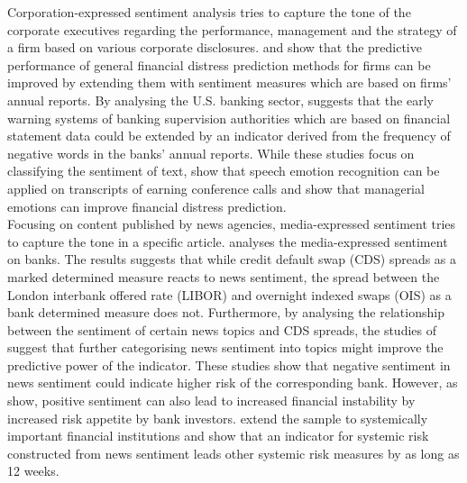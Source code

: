Corporation-expressed sentiment analysis tries to capture the tone of the corporate executives regarding the performance, management and the strategy of a firm based on various corporate disclosures. \cite{hajek2023} and \cite{huang2023} show that the predictive performance of general financial distress prediction methods for firms can be improved by extending them with sentiment measures which are based on firms' annual reports. By analysing the U.S. banking sector, \cite{gandhi2019} suggests that the early warning systems of banking supervision authorities which are based on financial statement data could be extended by an indicator derived from the frequency of negative words in the banks' annual reports. While these studies focus on classifying the sentiment of text, \cite{hajek2023} show that speech emotion recognition can be applied on transcripts of earning conference calls and show that managerial emotions can improve financial distress prediction. \\

 Focusing on content published by news agencies, media-expressed sentiment tries to capture the tone in a specific article. \cite{smales2016} analyses the media-expressed sentiment on banks. The results suggests that while credit default swap (CDS) spreads as a marked determined measure reacts to news sentiment, the spread between the London interbank offered rate (LIBOR) and overnight indexed swaps (OIS) as a bank determined measure does not. Furthermore, by analysing the relationship between the sentiment of certain news topics and CDS spreads, the studies of \cite{roeder2020} suggest that further categorising news sentiment into topics might improve the predictive power of the indicator. These studies show that negative sentiment in news sentiment could indicate higher risk of the corresponding bank. However, as \cite{agoraki2022} show, positive sentiment can also lead to increased financial instability by increased risk appetite by bank investors. \cite{borovkova2017} extend the sample to systemically important financial institutions and show that an indicator for systemic risk constructed from news sentiment leads other systemic risk measures by as long as 12 weeks. \\
 
